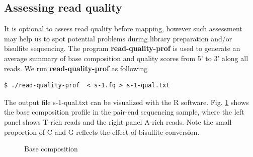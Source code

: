\documentclass{article}
\begin{document}
\subsection{Assessing read quality}
\label{sec:read-qual-assessm}
It is optional to assess read quality before mapping, however such
assessment may help us to spot potential problems during library
preparation and/or bisulfite sequencing. The program
\textbf{read-quality-prof} is used to generate an average summary of
base composition and quality scores from 5' to 3' along all
reads.  We run \textbf{read-quality-prof} as following 
\begin{verbatim}
$ ./read-quality-prof  < s-1.fq > s-1-qual.txt
\end{verbatim}
The output file s-1-qual.txt can be visualized with the R software. 
Fig. \ref{fig:base-composition} shows the base composition profile in
the pair-end sequencing sample, where the left panel shows  T-rich
reads and the right panel A-rich reads. Note the small proportion of C
and G reflects the effect of bisulfite conversion.   

\begin{figure}[htbp]
  \centering
{}
  \caption{Base composition}
  \label{fig:base-composition}
\end{figure}
\end{document}
